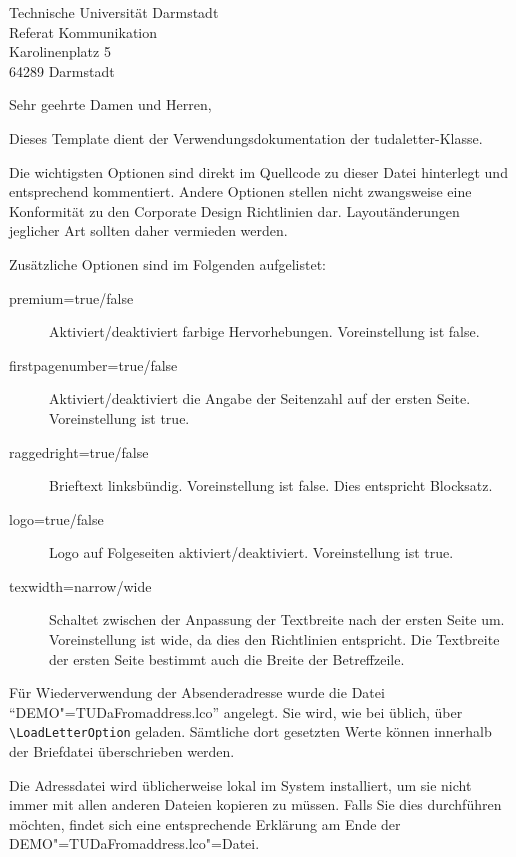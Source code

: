 \documentclass[
	ngerman,
	accentcolor=9c,%
	premium=true,%
]{tudaletter}
\begin{document}
\begin{letter}{%
    Technische Universität Darmstadt\\%
    Referat Kommunikation\\%
    Karolinenplatz 5\\%
    64289 Darmstadt}


\opening{Sehr geehrte Damen und Herren,}
Dieses Template dient der Verwendungsdokumentation der tudaletter-Klasse.

Die wichtigsten Optionen sind direkt im Quellcode zu dieser Datei hinterlegt und entsprechend kommentiert. Andere Optionen stellen nicht zwangsweise eine Konformität zu den Corporate Design Richtlinien dar. Layoutänderungen jeglicher Art sollten daher vermieden werden.

Zusätzliche Optionen sind im Folgenden aufgelistet:\\
\parbox{\linewidth}{
\begin{description}
	\item[premium=true/false] Aktiviert/deaktiviert farbige Hervorhebungen. Voreinstellung ist false.
	\item[firstpagenumber=true/false] Aktiviert/deaktiviert die Angabe der Seitenzahl auf der ersten Seite. Voreinstellung ist true.
	\item[raggedright=true/false] Brieftext linksbündig. Voreinstellung ist false. Dies entspricht Blocksatz.
	\item[logo=true/false] Logo auf Folgeseiten aktiviert/deaktiviert. Voreinstellung ist true.
	\item[texwidth=narrow/wide] Schaltet zwischen der Anpassung der Textbreite nach der ersten Seite um. Voreinstellung ist wide, da dies den Richtlinien entspricht. Die Textbreite der ersten Seite bestimmt auch die Breite der Betreffzeile.
\end{description}
}

Für Wiederverwendung der Absenderadresse wurde die Datei \enquote{DEMO"=TUDaFromaddress.lco} angelegt. Sie wird, wie bei \KOMAScript{} üblich, über 
\verb+\LoadLetterOption+ geladen. Sämtliche dort gesetzten Werte können innerhalb der Briefdatei überschrieben werden.

Die Adressdatei wird üblicherweise lokal im System installiert, um sie nicht immer mit allen anderen Dateien kopieren zu müssen. Falls Sie dies durchführen möchten, findet sich eine entsprechende Erklärung am Ende der DEMO"=TUDaFromaddress.lco"=Datei.


\end{letter}
\end{document}

